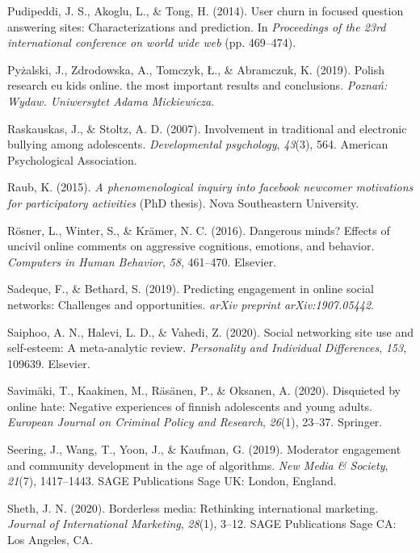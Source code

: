 \documentclass[10pt,dvipsnames]{scrartcl}
\begin{document}
\hypertarget{ref-pudipeddi2014user}{}
Pudipeddi, J. S., Akoglu, L., \& Tong, H. (2014). User churn in focused
question answering sites: Characterizations and prediction. In
\emph{Proceedings of the 23rd international conference on world wide
web} (pp. 469--474).

\hypertarget{ref-pyzalski2019polish}{}
Pyżalski, J., Zdrodowska, A., Tomczyk, Ł., \& Abramczuk, K. (2019).
Polish research eu kids online. the most important results and
conclusions. \emph{Poznań: Wydaw. Uniwersytet Adama Mickiewicza}.

\hypertarget{ref-raskauskas2007involvement}{}
Raskauskas, J., \& Stoltz, A. D. (2007). Involvement in traditional and
electronic bullying among adolescents. \emph{Developmental psychology},
\emph{43}(3), 564. American Psychological Association.

\hypertarget{ref-raub2015phenomenological}{}
Raub, K. (2015). \emph{A phenomenological inquiry into facebook newcomer
motivations for participatory activities} (PhD thesis). Nova
Southeastern University.

\hypertarget{ref-rosner2016dangerous}{}
Rösner, L., Winter, S., \& Krämer, N. C. (2016). Dangerous minds?
Effects of uncivil online comments on aggressive cognitions, emotions,
and behavior. \emph{Computers in Human Behavior}, \emph{58}, 461--470.
Elsevier.

\hypertarget{ref-sadeque2019predicting}{}
Sadeque, F., \& Bethard, S. (2019). Predicting engagement in online
social networks: Challenges and opportunities. \emph{arXiv preprint
arXiv:1907.05442}.

\hypertarget{ref-saiphoo2020social}{}
Saiphoo, A. N., Halevi, L. D., \& Vahedi, Z. (2020). Social networking
site use and self-esteem: A meta-analytic review. \emph{Personality and
Individual Differences}, \emph{153}, 109639. Elsevier.

\hypertarget{ref-savimaki2020disquieted}{}
Savimäki, T., Kaakinen, M., Räsänen, P., \& Oksanen, A. (2020).
Disquieted by online hate: Negative experiences of finnish adolescents
and young adults. \emph{European Journal on Criminal Policy and
Research}, \emph{26}(1), 23--37. Springer.

\hypertarget{ref-seering2019moderator}{}
Seering, J., Wang, T., Yoon, J., \& Kaufman, G. (2019). Moderator
engagement and community development in the age of algorithms. \emph{New
Media \& Society}, \emph{21}(7), 1417--1443. SAGE Publications Sage UK:
London, England.

\hypertarget{ref-sheth2020borderless}{}
Sheth, J. N. (2020). Borderless media: Rethinking international
marketing. \emph{Journal of International Marketing}, \emph{28}(1),
3--12. SAGE Publications Sage CA: Los Angeles, CA.
\end{document}
